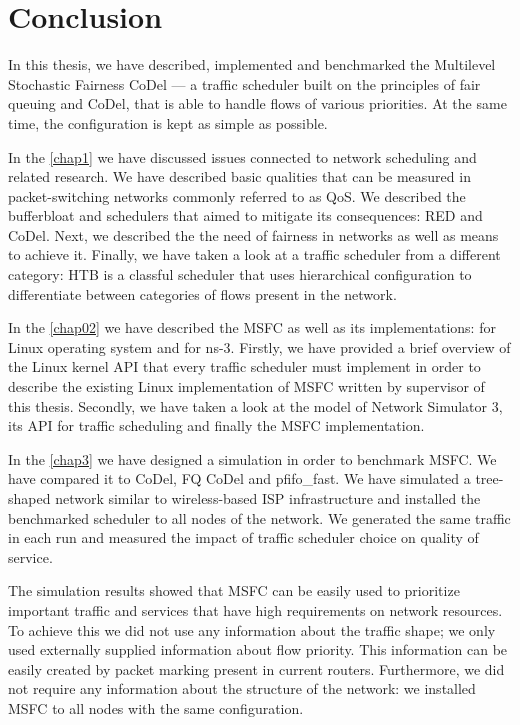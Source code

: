 \chapter*{Conclusion}

In this thesis, we have described, implemented and benchmarked the Multilevel Stochastic Fairness CoDel --- a traffic scheduler built on the principles of fair queuing and CoDel, that is able to handle flows of various priorities. At the same time, the configuration is kept as simple as possible. 

In the \autoref{chap1} we have discussed issues connected to network scheduling and related research. We have described basic qualities that can be measured in packet-switching networks commonly referred to as QoS. We described the bufferbloat and schedulers that aimed to mitigate its consequences: RED and CoDel. Next, we described the the need of fairness in networks as well as means to achieve it. Finally, we have taken a look at a traffic scheduler from a different category: HTB is a classful scheduler that uses hierarchical configuration to differentiate between categories of flows present in the network.

In the \autoref{chap02} we have described the MSFC as well as its implementations: for Linux operating system and for ns-3. Firstly, we have provided a brief overview of the Linux kernel API that every traffic scheduler must implement in order to describe the existing Linux implementation of MSFC written by supervisor of this thesis. Secondly, we have taken a look at the model of Network Simulator 3, its API for traffic scheduling and finally the MSFC implementation.

In the \autoref{chap3} we have designed a simulation in order to benchmark MSFC. We have compared it to CoDel, FQ CoDel and pfifo\_fast. We have simulated a tree-shaped network similar to wireless-based ISP infrastructure and installed the benchmarked scheduler to all nodes of the network. We generated the same traffic in each run and measured the impact of traffic scheduler choice on quality of service.

The simulation results showed that MSFC can be easily used to prioritize important traffic and services that have high requirements on network resources. To achieve this we did not use any information about the traffic shape; we only used externally supplied information about flow priority. This information can be easily created by packet marking present in current routers. Furthermore, we did not require any information about the structure of the network: we installed MSFC to all nodes with the same configuration.



